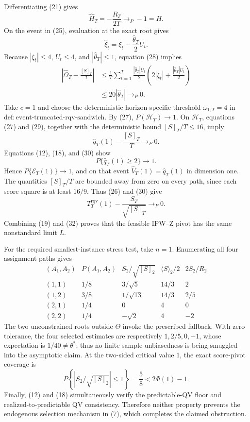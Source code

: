 Differentiating (21) gives
\[
\widehat H_T=-\frac{R_T}{2T}\to_P-1=H.
\tag{27}
\]
On the event in (25), evaluation at the exact root gives
\[
\widehat\xi_t=\xi_t-\frac{\widehat\theta_T}{2}U_t.
\tag{28}
\]
Because \(|\xi_t|\le4\), \(U_t\le4\), and \(|\widehat\theta_T|\le1\), equation (28) implies
\[
\begin{aligned}
\left|\widehat\Omega_T-\frac{[S]_T}{T}\right|
&\le\frac1T\sum_{t=1}^T
\frac{|\widehat\theta_T|U_t}{2}
\left(2|\xi_t|+\frac{|\widehat\theta_T|U_t}{2}\right)\\
&\le20|\widehat\theta_T|\to_P0.
\end{aligned}
\tag{29}
\]
Take \(c=1\) and choose the deterministic horizon-specific threshold \(\omega_{1,T}=4\) in \(\mathrm{def:event\text{-}truncated\text{-}rqv\text{-}sandwich}\). By (27), \(P(\mathcal H_T)\to1\). On \(\mathcal H_T\), equations (27) and (29), together with the deterministic bound \([S]_T/T\le16\), imply
\[
\widehat q_T(1)-\frac{[S]_T}{T}\to_P0.
\tag{30}
\]
Equations (12), (18), and (30) show
\[
P\{\widehat q_T(1)\ge2\}\longrightarrow1.
\tag{31}
\]
Hence \(P\{\mathcal E_T(1)\}\to1\), and on that event \(\widehat V_T(1)=\widehat q_T(1)\) in dimension one. The quantities \([S]_T/T\) are bounded away from zero on every path, since each score square is at least \(16/9\). Thus (26) and (30) give
\[
T_T^{\mathrm{rqv}}(1)-\frac{S_T}{\sqrt{[S]_T}}\to_P0.
\tag{32}
\]
Combining (19) and (32) proves that the feasible IPW--Z pivot has the same nonstandard limit \(L\).

For the required smallest-instance stress test, take \(n=1\). Enumerating all four assignment paths gives
\[
\begin{array}{c|c|c|c|c}
(A_1,A_2)&P(A_1,A_2)&S_2/\sqrt{[S]_2}&\langle S\rangle_2/2&2S_2/R_2\\ \hline
(1,1)&1/8&3/\sqrt5&14/3&2\\
(1,2)&3/8&1/\sqrt{13}&14/3&2/5\\
(2,1)&1/4&0&4&0\\
(2,2)&1/4&-\sqrt2&4&-2
\end{array}
\tag{33}
\]
The two unconstrained roots outside \(\Theta\) invoke the prescribed fallback. With zero tolerance, the four selected estimates are respectively \(1,2/5,0,-1\), whose expectation is \(1/40\ne\theta^*\); thus no finite-sample unbiasedness is being smuggled into the asymptotic claim. At the two-sided critical value \(1\), the exact score-pivot coverage is
\[
P\left\{\left|S_2/\sqrt{[S]_2}\right|\le1\right\}=\frac58
<2\Phi(1)-1.
\tag{34}
\]
Finally, (12) and (18) simultaneously verify the predictable-QV floor and realized-to-predictable QV consistency. Therefore neither property prevents the endogenous selection mechanism in (7), which completes the claimed obstruction.